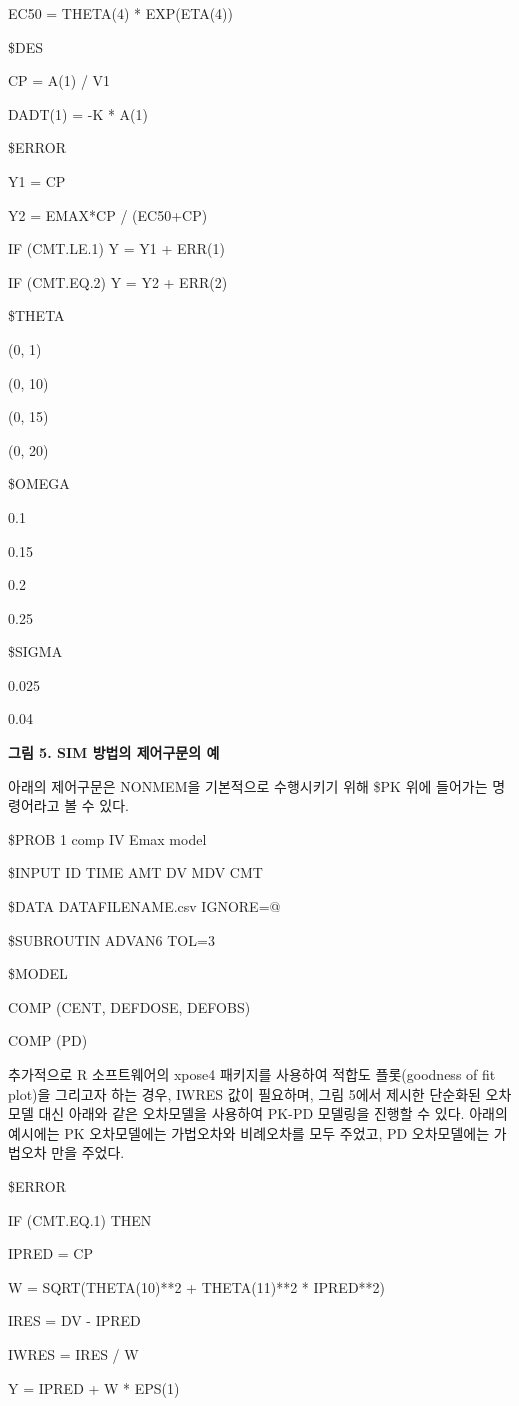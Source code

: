 \documentclass[
  10pt,
]{krantz}
\begin{document}
EC50 = THETA(4) * EXP(ETA(4))

\$DES

CP = A(1) / V1

DADT(1) = -K * A(1)

\$ERROR

Y1 = CP

Y2 = EMAX*CP / (EC50+CP)

IF (CMT.LE.1) Y = Y1 + ERR(1)

IF (CMT.EQ.2) Y = Y2 + ERR(2)

\$THETA

(0, 1)

(0, 10)

(0, 15)

(0, 20)

\$OMEGA

0.1

0.15

0.2

0.25

\$SIGMA

0.025

0.04

\textbf{그림 5. SIM 방법의 제어구문의 예}

아래의 제어구문은 NONMEM을 기본적으로 수행시키기 위해 \$PK 위에 들어가는 명령어라고 볼 수 있다.

\$PROB 1 comp IV Emax model

\$INPUT ID TIME AMT DV MDV CMT

\$DATA DATAFILENAME.csv IGNORE=@

\$SUBROUTIN ADVAN6 TOL=3

\$MODEL

COMP (CENT, DEFDOSE, DEFOBS)

COMP (PD)

추가적으로 R 소프트웨어의 xpose4 패키지를 사용하여 적합도 플롯(goodness of fit plot)을 그리고자 하는
경우, IWRES 값이 필요하며, 그림 5에서 제시한 단순화된 오차모델 대신 아래와 같은 오차모델을 사용하여 PK-PD
모델링을 진행할 수 있다. 아래의 예시에는 PK 오차모델에는 가법오차와 비례오차를 모두 주었고, PD 오차모델에는 가법오차
만을 주었다.

\$ERROR

IF (CMT.EQ.1) THEN

IPRED = CP

W = SQRT(THETA(10)**2 + THETA(11)**2 * IPRED**2)

IRES = DV - IPRED

IWRES = IRES / W

Y = IPRED + W * EPS(1)
\end{document}
